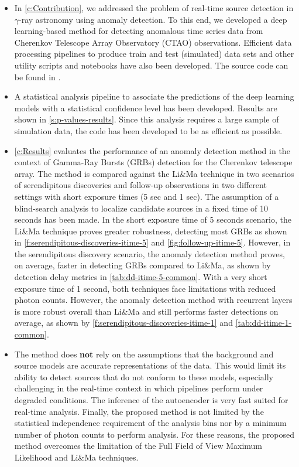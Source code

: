 \begin{itemize}

    \item In \autoref{c:Contribution}, we addressed the problem of real-time source detection in $\gamma$-ray astronomy using anomaly detection. To this end, we developed a deep learning-based method for detecting anomalous time series data from Cherenkov Telescope Array Observatory (CTAO) observations. Efficient data processing pipelines to produce train and test (simulated) data sets and other utility scripts and notebooks have also been developed. The source code can be found in \cite{Baroncelli_2023}.

    \item A statistical analysis pipeline to associate the predictions of the deep learning models with a statistical confidence level has been developed. Results are shown in \autoref{s:p-values-results}. Since this analysis requires a large sample of simulation data, the code has been developed to be as efficient as possible.
        
    \item \autoref{c:Results} evaluates the performance of an anomaly detection method in the context of Gamma-Ray Bursts (GRBs) detection for the Cherenkov telescope array. The method is compared against the Li\&Ma technique in two scenarios of serendipitous discoveries and follow-up observations in two different settings with short exposure times (5 sec and 1 sec). The assumption of a blind-search analysis to localize candidate sources in a fixed time of 10 seconds has been made. In the short exposure time of 5 seconds scenario, the Li\&Ma technique proves greater robustness, detecting most GRBs as shown in \autoref{f:serendipitous-discoveries-itime-5} and \autoref{fig:follow-up-itime-5}. However, in the serendipitous discovery scenario, the anomaly detection method proves, on average, faster in detecting GRBs compared to Li\&Ma, as shown by detection delay metrics in \autoref{tab:dd-itime-5-common}. 
    With a very short exposure time of 1 second, both techniques face limitations with reduced photon counts. However, the anomaly detection method with recurrent layers is more robust overall than Li\&Ma and still performs faster detections on average, as shown by \autoref{f:serendipitous-discoveries-itime-1} and \autoref{tab:dd-itime-1-common}.

    \item The method does \textbf{not} rely on the assumptions that the background and source models are accurate representations of the data. This would limit its ability to detect sources that do not conform to these models, especially challenging in the real-time context in which pipelines perform under degraded conditions. The inference of the autoencoder is very fast suited for real-time analysis. Finally, the proposed method is not limited by the statistical independence requirement of the analysis bins nor by a minimum number of photon counts to perform analysis. For these reasons, the proposed method overcomes the limitation of the Full Field of View Maximum Likelihood and Li\&Ma techniques.
    

\end{itemize}
